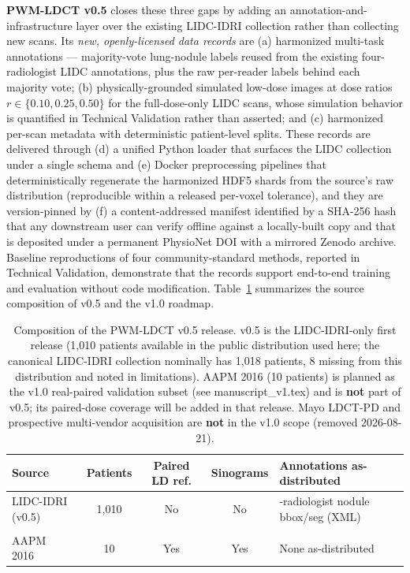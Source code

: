 \documentclass[twoside,11pt]{article}
\begin{document}
\textbf{PWM-LDCT v0.5} closes these three gaps by adding an annotation-and-infrastructure layer over the existing LIDC-IDRI collection rather than collecting new scans. Its \emph{new, openly-licensed data records} are (a) harmonized multi-task annotations --- majority-vote lung-nodule labels reused from the existing four-radiologist LIDC annotations, plus the raw per-reader labels behind each majority vote; (b) physically-grounded simulated low-dose images at dose ratios $r \in \{0.10, 0.25, 0.50\}$ for the full-dose-only LIDC scans, whose simulation behavior is quantified in Technical Validation rather than asserted; and (c) harmonized per-scan metadata with deterministic patient-level splits. These records are delivered through (d) a unified Python loader that surfaces the LIDC collection under a single schema and (e) Docker preprocessing pipelines that deterministically regenerate the harmonized HDF5 shards from the source's raw distribution (reproducible within a released per-voxel tolerance), and they are version-pinned by (f) a content-addressed manifest identified by a SHA-256 hash that any downstream user can verify offline against a locally-built copy and that is deposited under a permanent PhysioNet DOI with a mirrored Zenodo archive. Baseline reproductions of four community-standard methods, reported in Technical Validation, demonstrate that the records support end-to-end training and evaluation without code modification. Table~\ref{tab:source_comparison} summarizes the source composition of v0.5 and the v1.0 roadmap.

\begin{table}[ht]
    \centering
    \small
    \setlength{\tabcolsep}{4pt}
    \begin{tabularx}{\textwidth}{@{}>{\raggedright\arraybackslash}X c c c >{\raggedright\arraybackslash}X@{}}
        \toprule
        \textbf{Source} & \textbf{Patients} & \textbf{Paired LD ref.} & \textbf{Sinograms} & \textbf{Annotations as-distributed} \\
        \midrule
        LIDC-IDRI~\citep{lidc_idri} (v0.5)            & 1{,}010 & No  & No  & 4-radiologist nodule bbox/seg (XML) \\
        \midrule
        \multicolumn{5}{@{}l}{\textit{v1.0 validation subset (planned; not in v0.5)}} \\
        AAPM 2016~\citep{aapm2016challenge}    & 10      & Yes & Yes & None as-distributed \\
        \bottomrule
    \end{tabularx}
    \caption{Composition of the PWM-LDCT v0.5 release. v0.5 is the LIDC-IDRI-only first release (1{,}010 patients available in the public distribution used here; the canonical LIDC-IDRI collection nominally has 1{,}018 patients, 8 missing from this distribution and noted in limitations). AAPM 2016 (10 patients) is planned as the v1.0 real-paired validation subset (see manuscript\_v1.tex) and is \textbf{not} part of v0.5; its paired-dose coverage will be added in that release. Mayo LDCT-PD and prospective multi-vendor acquisition are \textbf{not} in the v1.0 scope (removed 2026-08-21).}
    \label{tab:source_comparison}
\end{table}
\end{document}
